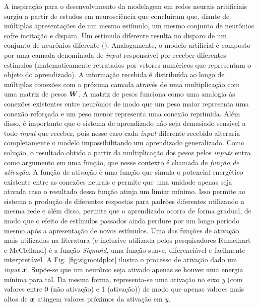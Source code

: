 A inspiração para o desenvolvimento da modelagem em redes neurais aritificiais surgiu a partir de estudos em neurosciência %
que concluiram que, diante de múltiplas apresentações de um mesmo estímulo, um mesmo conjunto de neurônios sofre incitação e dispara. Um estímulo diferente resulta no disparo de um conjunto de neurônios diferente (\cite{hubel:1962}).  Analogamente, o modelo artificial é composto por uma camada denominada de \textit{input} responsável por receber diferentes estímulos (matematicamente retratados por vetores numéricos que representam o objeto do aprendizado). A informação recebida é distribuída ao longo de múltiplas conexões com a próxima camada através de uma multiplicação com uma matriz de pesos $\bm{W}$. A matriz de pesos funciona como uma analogia às conexões existentes entre neurônios de modo que um peso maior representa uma conexão reforçada e um peso menor representa uma conexão reprimida. Além disso, é importante que o sistema de aprendizado não seja demasiado sensível a todo \textit{input} que receber, pois nesse caso cada \textit{input} diferente recebido alteraria completamente o modelo impossibilitando um aprendizado generalizado. Como solução, o resultado obtido a partir da multiplicação dos pesos pelos \textit{inputs} entra como argumento em uma função, que nesse contexto é chamada de \textit{função de ativação}. A função de ativação é uma função que simula o potencial energético existente entre as conexões neurais e permite que uma unidade apenas seja ativada caso o resultado dessa função atinja um limiar mínimo. Isso permite ao sistema a produção de diferentes respostas para padrões diferentes utilizando a mesma rede e além disso, permite que o aprendizado ocorra de forma gradual, de modo que o efeito de estímulos passados ainda perdure por um longo período mesmo após a apresentação de novos estímulos. Uma das funções de ativação mais utilizadas na literatura (e inclusive utilizada pelos pesquisadores Rumelhart e McClelland) é a função \textit{Sigmoid}, uma função suave, diferenciável e facilmente interpretável. A Fig. \ref{fig:sigmoidplot} ilustra o processo de ativação dado um \textit{input} $\bm{x}$. Supõe-se que um neurônio seja ativado apenas se houver uma energia mínima para tal. Da mesma forma, representa-se uma ativação no eixo \textit{y} (com valores entre 0 (não ativação) e 1 (ativação)) de modo que apenas valores mais altos de $\bm{x}$ atingem valores próximos da ativação em \textit{y}.



